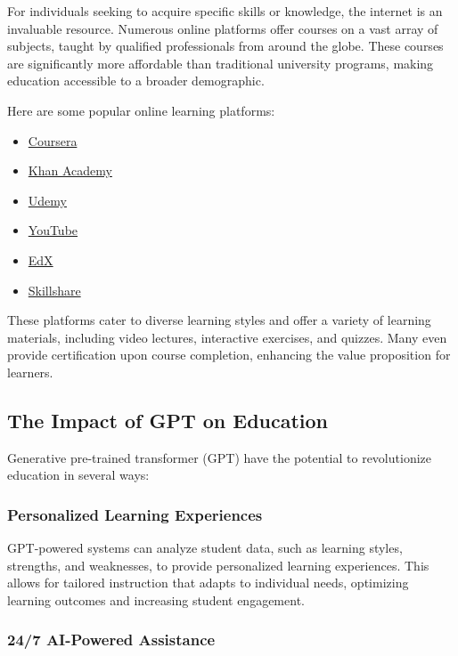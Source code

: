 \documentclass[a4paper,11pt]{article}
\begin{document}
For individuals seeking to acquire specific skills or knowledge, the internet is an invaluable resource. Numerous online platforms offer courses on a vast array of subjects, taught by qualified professionals from around the globe. These courses are significantly more affordable than traditional university programs, making education accessible to a broader demographic.

Here are some popular online learning platforms:
\begin {itemize}
	\item \href{https://www.coursera.org/}{Coursera} 
	\item \href{https://www.khanacademy.org/}{Khan Academy} 
	\item \href{https://www.udemy.com/}{Udemy} 
	\item \href{https://www.youtube.com/}{YouTube} 
	\item \href{https://www.edx.org/}{EdX} 
	\item \href{https://www.skillshare.com/}{Skillshare}
\end {itemize}
These platforms cater to diverse learning styles and offer a variety of learning materials, including video lectures, interactive exercises, and quizzes. Many even provide certification upon course completion, enhancing the value proposition for learners.\cite{role-internet-in-education}

\subsection{The Impact of GPT on Education}

Generative pre-trained transformer (GPT) have the potential to revolutionize education in several ways: \cite{ai-in-education}

\subsubsection{Personalized Learning Experiences}

GPT-powered systems can analyze student data, such as learning styles, strengths, and weaknesses, to provide personalized learning experiences. This allows for tailored instruction that adapts to individual needs, optimizing learning outcomes and increasing student engagement.

\subsubsection{24/7 AI-Powered Assistance}
\end{document}
